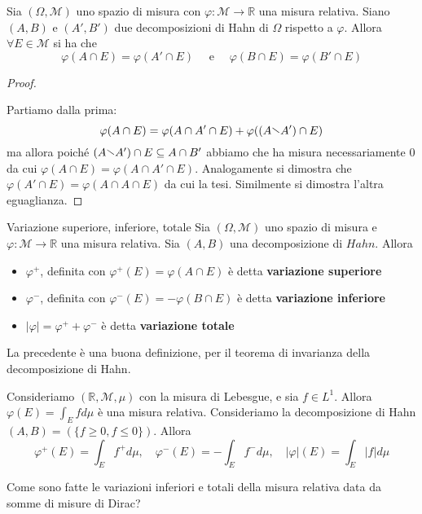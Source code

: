 \begin{theorem}
    Sia \((\Omega, \mathcal{M})\) uno spazio di misura con \(\varphi :
    \mathcal{M} \to \mathbb{R}\) una misura relativa. Siano \((A, B)\) e \((A',
    B')\) due decomposizioni di Hahn di \(\Omega\) rispetto a \(\varphi\).
    Allora \(\forall E \in \mathcal{M}\) si ha che 
    \[
        \varphi(A \cap E) = \varphi(A' \cap E) \quad \text{ e } \quad \varphi(B
        \cap E) = \varphi(B' \cap E)
    \]
\end{theorem}
\begin{proof}
\begin{figure}[ht]
    \centering
    \label{fig:diminvaranza}
\end{figure}
Partiamo dalla prima:
\[
    \varphi(A \cap E) = \varphi(A \cap A' \cap E) + \varphi((A \sminus A') \cap E)
\]
ma allora poiché \((A \sminus A') \cap E \subseteq A \cap B'\) abbiamo che ha
misura necessariamente \(0\) da cui \(\varphi(A \cap E) = \varphi(A \cap A' \cap
E)\). Analogamente si dimostra che \(\varphi(A' \cap E) = \varphi(A \cap A \cap
E)\) da cui la tesi. Similmente si dimostra l'altra eguaglianza.
\end{proof}

\begin{definition}{Variazione superiore, inferiore, totale}
    Sia \((\Omega, \mathcal{M})\) uno spazio di misura e \(\varphi : \mathcal{M}
    \to \mathbb{R}\) una misura relativa. Sia \((A, B)\) una decomposizione di
    \(Hahn\). Allora
\begin{itemize}[label = --]
    \item \(\varphi^{+}\), definita con \(\varphi^{+}(E) = \varphi(A \cap E)\) è
        detta \textbf{variazione superiore}
    \item \(\varphi^{-}\), definita con \(\varphi^{-}(E) = -\varphi(B \cap E)\)
        è detta \textbf{variazione inferiore}
    \item \(|\varphi| = \varphi^{+} + \varphi^{-}\) è detta \textbf{variazione totale}
\end{itemize}
\end{definition}
\begin{remark}
    La precedente è una buona definizione, per il teorema di invarianza della
    decomposizione di Hahn.
\end{remark}
\begin{example}
    Consideriamo \((\mathbb{R}, \mathcal{M}, \mu)\) con la misura di Lebesgue, e
    sia \(f \in L^{1}\). Allora \(\varphi(E) = \int_E f d\mu\) è una misura
    relativa. Consideriamo la decomposizione di Hahn \((A, B) = (\{ f \ge 0, f
    \le 0\})\). Allora
    \[
        \varphi^{+}(E) = \int_{E} f^{+} d\mu, \quad 
        \varphi^{-}(E) = -\int_{E} f^{-} d\mu, \quad 
        |\varphi|(E) = \int_{E} |f| d\mu
    \]
\end{example}
\begin{eser}
    Come sono fatte le variazioni inferiori e totali della misura relativa data
    da somme di misure di Dirac?
\end{eser}

